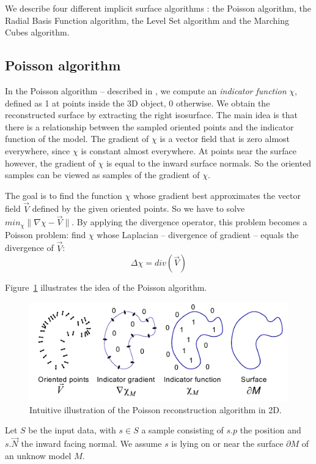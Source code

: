 \documentclass[12pt]{article}
\begin{document}
We describe four different implicit surface algorithms : the Poisson algorithm, the Radial Basis Function algorithm, the Level Set algorithm and the Marching Cubes algorithm.

\subsection{Poisson algorithm}
In the Poisson algorithm -- described in \cite{Poisson}, we compute an \emph{indicator function} $\chi$, defined as 1 at points inside the 3D object, 0 otherwise. We obtain the reconstructed surface by extracting the right isosurface. The main idea is that there is a relationship between the sampled oriented points and the indicator function of the model. The gradient of $\chi$ is  a vector field that is zero almost everywhere, since $\chi$ is constant almost everywhere. At points near the surface however, the gradient of $\chi$ is equal to the inward surface normals. So the oriented samples can be viewed as samples of the gradient of $\chi$.

The goal is to find the function $\chi$ whose gradient best approximates the vector field $\vec{V}$ defined by the given oriented points. So we have to solve $min_\chi\|\nabla\chi - \vec{V}\|$. By applying the divergence operator, this problem becomes a Poisson problem: find $\chi$ whose Laplacian -- divergence of gradient -- equals the divergence of $\vec{V}$:
$$\Delta\chi = div(\vec{V})$$

Figure~\ref{poissonidea} illustrates the idea of the Poisson algorithm.

\begin{figure}[h]
  \centering
  \includegraphics[scale=0.5]{poissonidea.png}
  \caption{\label{poissonidea} Intuitive illustration of the Poisson reconstruction algorithm in 2D.
}
\end{figure}

Let $S$ be the input data, with $s \in S$ a sample consisting of $s.p$ the position and $s.\vec{N}$ the inward facing normal. We assume $s$ is lying on or near the surface $\partial M$ of an unknow model $M$.
\end{document}
